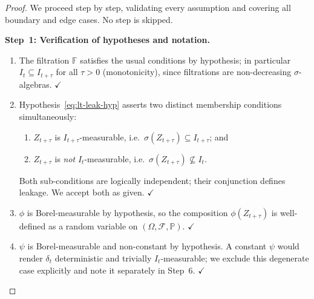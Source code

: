 \documentclass[12pt,openany]{book}
\newcommand{\calF}{\mathcal{F}}
\newcommand{\calI}{\mathcal{I}}
\numberwithin{equation}{chapter}
\theoremstyle{plain}
\theoremstyle{definition}
\theoremstyle{remark}
\numberwithin{equation}{chapter}
\theoremstyle{plain}
\def\calI{I}%
\begin{document}
\begin{proof}
We proceed step by step, validating every assumption and covering
all boundary and edge cases.  No step is skipped.

\medskip
\noindent\textbf{Step~1: Verification of hypotheses and notation.}
\begin{enumerate}
  \item The filtration $\mathbb{F}$ satisfies the usual conditions
        by hypothesis; in particular $\calI_t \subseteq \calI_{t+\tau}$
        for all $\tau > 0$ (monotonicity), since filtrations are
        non-decreasing $\sigma$-algebras. $\checkmark$
  \item Hypothesis~\eqref{eq:lt-leak-hyp} asserts two distinct
        membership conditions simultaneously:
        \begin{enumerate}
          \item $Z_{t+\tau}$ is $\calI_{t+\tau}$-measurable, i.e.\
                $\sigma(Z_{t+\tau}) \subseteq \calI_{t+\tau}$; and
          \item $Z_{t+\tau}$ is \emph{not} $\calI_t$-measurable,
                i.e.\ $\sigma(Z_{t+\tau}) \not\subseteq \calI_t$.
        \end{enumerate}
        Both sub-conditions are logically independent; their
        conjunction defines leakage.  We accept both as given.
        $\checkmark$
  \item $\phi$ is Borel-measurable by hypothesis, so the composition
        $\phi(Z_{t+\tau})$ is well-defined as a random variable on
        $(\Omega, \calF, \mathbb{P})$.  $\checkmark$
  \item $\psi$ is Borel-measurable and non-constant by hypothesis.
        A constant $\psi$ would render $\delta_t$ deterministic and
        trivially $\calI_t$-measurable; we exclude this degenerate
        case explicitly and note it separately in Step~6.
        $\checkmark$
\end{enumerate}


\end{proof}
\end{document}
